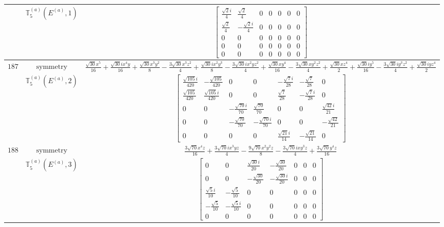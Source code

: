 \documentclass[fleqn,8pt,landscape]{jsarticle}
\begin{document}
\begin{longtable}{ccc}
$  $ & $ \mathbb{T}_{5}^{(a)}(E^{(a)},1) $ & $ \begin{bmatrix} \frac{\sqrt{2} i}{4} & \frac{\sqrt{2}}{4} & 0 & 0 & 0 & 0 & 0 \\ \frac{\sqrt{2}}{4} & - \frac{\sqrt{2} i}{4} & 0 & 0 & 0 & 0 & 0 \\ 0 & 0 & 0 & 0 & 0 & 0 & 0 \\ 0 & 0 & 0 & 0 & 0 & 0 & 0 \\ 0 & 0 & 0 & 0 & 0 & 0 & 0 \end{bmatrix} $ \\ \hline
$ 187 $ & $ \text{symmetry} $ & $ \frac{\sqrt{30} x^{5}}{16} + \frac{\sqrt{30} i x^{4} y}{16} + \frac{\sqrt{30} x^{3} y^{2}}{8} - \frac{3 \sqrt{30} x^{3} z^{2}}{4} + \frac{\sqrt{30} i x^{2} y^{3}}{8} - \frac{3 \sqrt{30} i x^{2} y z^{2}}{4} + \frac{\sqrt{30} x y^{4}}{16} - \frac{3 \sqrt{30} x y^{2} z^{2}}{4} + \frac{\sqrt{30} x z^{4}}{2} + \frac{\sqrt{30} i y^{5}}{16} - \frac{3 \sqrt{30} i y^{3} z^{2}}{4} + \frac{\sqrt{30} i y z^{4}}{2} $ \\
$  $ & $ \mathbb{T}_{5}^{(a)}(E^{(a)},2) $ & $ \begin{bmatrix} \frac{\sqrt{105} i}{420} & - \frac{\sqrt{105}}{420} & 0 & 0 & - \frac{\sqrt{7} i}{28} & - \frac{\sqrt{7}}{28} & 0 \\ \frac{\sqrt{105}}{420} & \frac{\sqrt{105} i}{420} & 0 & 0 & \frac{\sqrt{7}}{28} & - \frac{\sqrt{7} i}{28} & 0 \\ 0 & 0 & - \frac{\sqrt{70} i}{70} & \frac{\sqrt{70}}{70} & 0 & 0 & \frac{\sqrt{42} i}{21} \\ 0 & 0 & - \frac{\sqrt{70}}{70} & - \frac{\sqrt{70} i}{70} & 0 & 0 & - \frac{\sqrt{42}}{21} \\ 0 & 0 & 0 & 0 & \frac{\sqrt{21} i}{14} & - \frac{\sqrt{21}}{14} & 0 \end{bmatrix} $ \\ \hline
$ 188 $ & $ \text{symmetry} $ & $ \frac{3 \sqrt{70} x^{4} z}{16} + \frac{3 \sqrt{70} i x^{3} y z}{4} - \frac{9 \sqrt{70} x^{2} y^{2} z}{8} - \frac{3 \sqrt{70} i x y^{3} z}{4} + \frac{3 \sqrt{70} y^{4} z}{16} $ \\
$  $ & $ \mathbb{T}_{5}^{(a)}(E^{(a)},3) $ & $ \begin{bmatrix} 0 & 0 & \frac{\sqrt{30} i}{20} & - \frac{\sqrt{30}}{20} & 0 & 0 & 0 \\ 0 & 0 & - \frac{\sqrt{30}}{20} & - \frac{\sqrt{30} i}{20} & 0 & 0 & 0 \\ \frac{\sqrt{5} i}{10} & - \frac{\sqrt{5}}{10} & 0 & 0 & 0 & 0 & 0 \\ - \frac{\sqrt{5}}{10} & - \frac{\sqrt{5} i}{10} & 0 & 0 & 0 & 0 & 0 \\ 0 & 0 & 0 & 0 & 0 & 0 & 0 \end{bmatrix} $ \\ \hline

\end{longtable}
\end{document}
